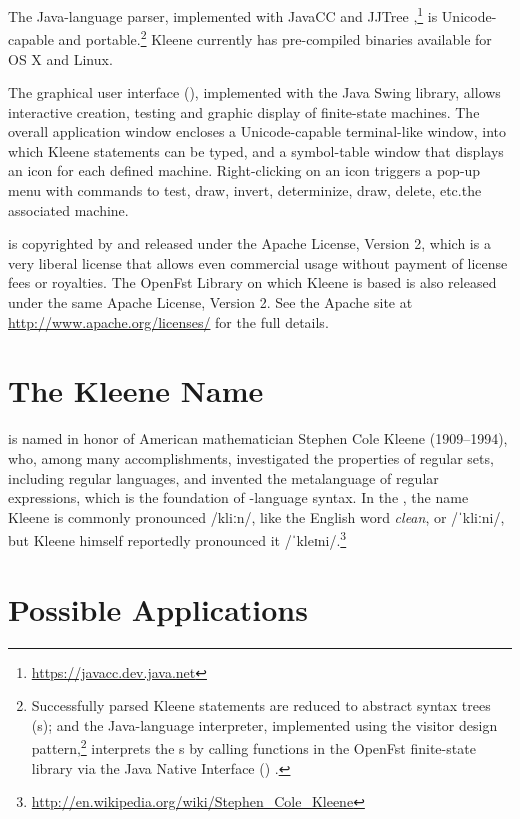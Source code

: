 The Java-language \Kleene{} parser, implemented with JavaCC and
JJTree \citep{copeland:2007},\footnote{\url{https://javacc.dev.java.net}} 
is Unicode-capable and portable.\footnote{Successfully parsed Kleene statements are reduced to abstract
syntax trees (s); and the Java-language interpreter,
implemented using the visitor design
pattern,\footnote{\url{http://en.wikipedia.org/wiki/Visitor_pattern}} 
interprets the s by calling \CPP{} functions in the
OpenFst finite-state 
library
\citep{allauzen+riley+schalkwyk+skut+mohri:2007}
via the Java Native Interface
() \citep{gordon:1998,liang:1999}. } Kleene currently has
pre-compiled binaries available for
OS X and Linux.

The \Kleene{} graphical user interface (), implemented with 
the Java Swing library, 
allows interactive creation, testing and graphic display
of finite-state machines.  The overall application window encloses a Unicode-capable terminal-like window, into which Kleene statements
can be typed,
and a symbol-table window that displays an icon for each defined
machine.  Right-clicking on an icon triggers a pop-up menu with
commands to test, draw, invert, determinize, draw, delete, 
etc.\@ the associated machine.

\Kleene{} is copyrighted by   and released under the Apache License, Version 2, which
is a very liberal license that allows even commercial usage without payment of license fees or
royalties.  The OpenFst Library on which Kleene is based is also released under the same Apache License,
Version 2.  See the Apache site at \url{http://www.apache.org/licenses/} for the full details.

\section{The Kleene Name}

\Kleene{} is named in honor of American mathematician Stephen Cole Kleene
(1909--1994), who, among many accomplishments, investigated the properties of regular sets, including
regular languages, and invented the metalanguage of regular expressions, which is the foundation of
\Kleene{}-language syntax.  In the , the name Kleene is
commonly pronounced /kliːn/, like the English word \emph{clean}, 
or /ˈkliːni/, but Kleene himself reportedly pronounced it
/ˈkleɪni/.\footnote{\url{http://en.wikipedia.org/wiki/Stephen_Cole_Kleene}}

\section{Possible Applications}

